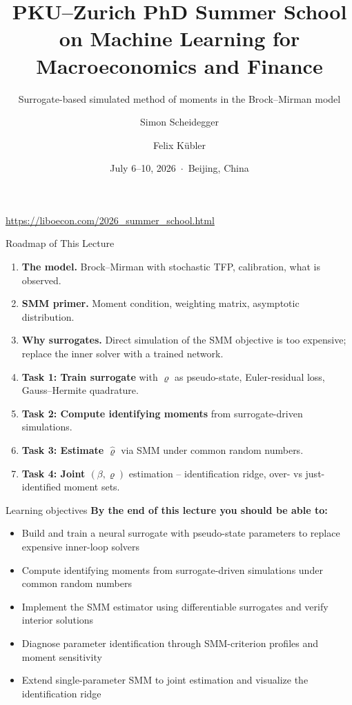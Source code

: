 \documentclass[10pt,aspectratio=169]{beamer}
\title[PKU--Zurich Summer School 2026]
{PKU--Zurich PhD Summer School on Machine Learning for Macroeconomics and Finance}
\subtitle{Surrogate-based simulated method of moments in the Brock--Mirman model}
\author{Simon Scheidegger \and Felix K\"ubler}
\institute{HEC Lausanne $\cdot$ University of Zurich}
\date{July 6--10, 2026 \,$\cdot$\, Beijing, China}
\begin{document}
{
\begin{frame}
\titlepage
\vspace{-0.3cm}
\begin{center}
{\footnotesize \url{https://liboecon.com/2026_summer_school.html}}
\end{center}
\end{frame}
}

\begin{frame}{Roadmap of This Lecture}
\small
\begin{enumerate}
    \item \textbf{The model.} Brock--Mirman with stochastic TFP, calibration, what is observed.
    \vspace{0.2em}
    \item \textbf{SMM primer.} Moment condition, weighting matrix, asymptotic distribution.
    \vspace{0.2em}
    \item \textbf{Why surrogates.} Direct simulation of the SMM objective is too expensive; replace the inner solver with a trained network.
    \vspace{0.2em}
    \item \textbf{Task 1: Train surrogate} with $\varrho$ as pseudo-state, Euler-residual loss, Gauss--Hermite quadrature.
    \vspace{0.2em}
    \item \textbf{Task 2: Compute identifying moments} from surrogate-driven simulations.
    \vspace{0.2em}
    \item \textbf{Task 3: Estimate $\hat\varrho$} via SMM under common random numbers.
    \vspace{0.2em}
    \item \textbf{Task 4: Joint $(\beta, \varrho)$} estimation -- identification ridge, over- vs just-identified moment sets.
\end{enumerate}
\end{frame}

\begin{frame}{Learning objectives}
\textbf{By the end of this lecture you should be able to:}
\begin{itemize}
  \item Build and train a neural surrogate with pseudo-state parameters to replace expensive inner-loop solvers
  \item Compute identifying moments from surrogate-driven simulations under common random numbers
  \item Implement the SMM estimator using differentiable surrogates and verify interior solutions
  \item Diagnose parameter identification through SMM-criterion profiles and moment sensitivity
  \item Extend single-parameter SMM to joint estimation and visualize the identification ridge
\end{itemize}
\end{frame}
\end{document}
